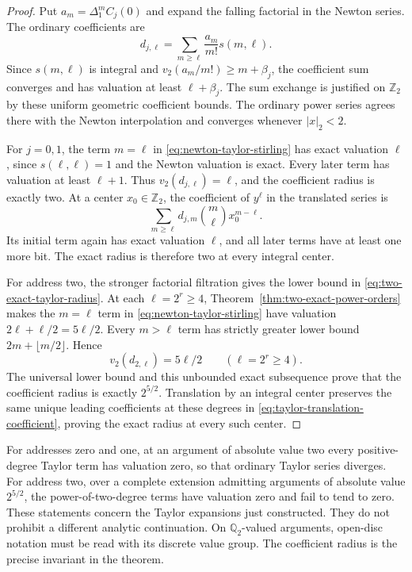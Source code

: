 \begin{proof}
Put $a_m=\Delta_1^mC_j(0)$ and expand the falling factorial in the
Newton series. The ordinary coefficients are
\begin{equation}
 d_{j,\ell}=\sum_{m\geq\ell}\frac{a_m}{m!}s(m,\ell).
 \label{eq:newton-taylor-stirling}
\end{equation}
Since $s(m,\ell)$ is integral and
$v_2(a_m/m!)\geq m+\beta_j$, the coefficient sum converges and has
valuation at least $\ell+\beta_j$. The sum exchange is justified on
$\mathbb Z_2$ by these uniform geometric coefficient bounds.
The ordinary power series agrees there with the Newton interpolation
and converges whenever $|x|_2<2$.

For $j=0,1$, the term $m=\ell$ in
\eqref{eq:newton-taylor-stirling} has exact valuation $\ell$, since
$s(\ell,\ell)=1$ and the Newton valuation is exact. Every later term
has valuation at least $\ell+1$. Thus
$v_2(d_{j,\ell})=\ell$, and the coefficient radius is exactly two.
At a center $x_0\in\mathbb Z_2$, the coefficient of $y^\ell$ in the
translated series is
\begin{equation}
 \sum_{m\geq\ell}d_{j,m}\binom m\ell x_0^{m-\ell}.
 \label{eq:taylor-translation-coefficient}
\end{equation}
Its initial term again has exact valuation $\ell$, and all later
terms have at least one more bit. The exact radius is therefore two
at every integral center.

For address two, the stronger factorial filtration gives the lower
bound in \eqref{eq:two-exact-taylor-radius}. At each
$\ell=2^r\geq4$, Theorem~\ref{thm:two-exact-power-orders} makes the
$m=\ell$ term in \eqref{eq:newton-taylor-stirling} have valuation
$2\ell+\ell/2=5\ell/2$. Every $m>\ell$ term has strictly greater
lower bound $2m+\lfloor m/2\rfloor$. Hence
\[
 v_2(d_{2,\ell})=5\ell/2\qquad(\ell=2^r\geq4).
\]
The universal lower bound and this unbounded exact subsequence prove
that the coefficient radius is exactly $2^{5/2}$. Translation by an
integral center preserves the same unique leading coefficients at
these degrees in \eqref{eq:taylor-translation-coefficient}, proving
the exact radius at every such center.
\end{proof}

\begin{remark}
For addresses zero and one, at an argument of absolute value two every
positive-degree Taylor term has valuation zero, so that ordinary Taylor
series diverges. For address two, over a complete extension admitting
arguments of absolute value $2^{5/2}$, the power-of-two-degree terms
have valuation zero and fail to tend to zero. These statements concern
the Taylor expansions just constructed. They do not prohibit a
different analytic continuation. On $\mathbb Q_2$-valued arguments,
open-disc notation must be read with its discrete value group. The
coefficient radius is the precise invariant in the theorem.
\end{remark}

